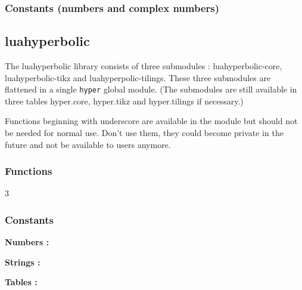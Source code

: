 \documentclass{article}
\begin{document}
\subsubsection*{Constants (numbers and complex numbers)}



\subsection{luahyperbolic}

The luahyperbolic library consists of three submodules : luahyperbolic-core,  luahyperbolic-tikz and luahyperpolic-tilings. These three submodules are flattened in a single \texttt{hyper} global module. (The submodules are still available in three tables hyper.core, hyper.tikz and hyper.tilings if necessary.)

Functions beginning with underscore are available in the module but should not be needed for normal use. Don't use them, they could become private in the future and not be available to users anymore.

\subsubsection*{Functions}
\begin{multicols}{3}
\noindent{}
\end{multicols}
\subsubsection*{Constants}
\textbf{Numbers : }

\textbf{Strings : }

\textbf{Tables : }

\printindex
\end{document}
